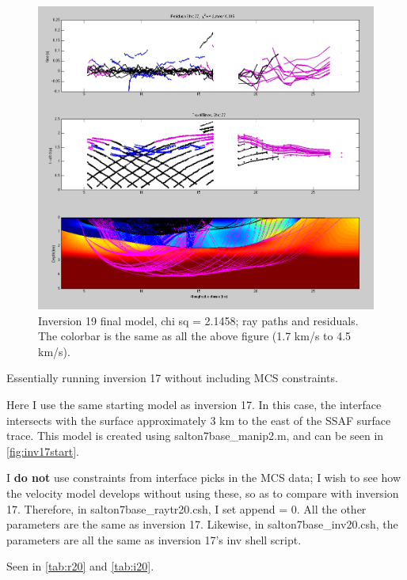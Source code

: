 \documentclass[fontsize=11pt, %
                             paper=a4, %
                             twoside, %
                             captions=tableheading,
                             index=totoc,
                             hyperref]{labbook}
\begin{document}
\begin{addmargin}[4cm]{0cm}
\begin{figure}[h!]
\raggedleft
\includegraphics[scale=0.4,keepaspectratio=true]{figs/Inv19finalRay.png}
\caption{Inversion 19 final model, chi sq = 2.1458; ray paths and residuals.  The colorbar is the same as all the above figure (1.7 km/s to 4.5 km/s).}
\label{fig:inv19fray}
\end{figure} 
 
\clearpage{}

 Essentially running inversion 17 without including MCS constraints.
 
Here I use the same starting model as inversion 17.  In this case, the interface intersects with the surface approximately 3 km to the east of the SSAF surface trace.  This model is created using salton7base\_manip2.m, and can be seen in \autoref{fig:inv17start}.   

I \textbf{do not} use constraints from interface picks in the MCS data; I wish to see how the velocity model develops without using these, so as to compare with inversion 17.  Therefore, in salton7base\_raytr20.csh, I set append = 0.  All the other parameters are the same as inversion 17.  Likewise, in salton7base\_inv20.csh, the parameters are all the same as inversion 17's inv shell script.

Seen in \autoref{tab:r20} and \autoref{tab:i20}.  


\end{addmargin}
\end{document}
